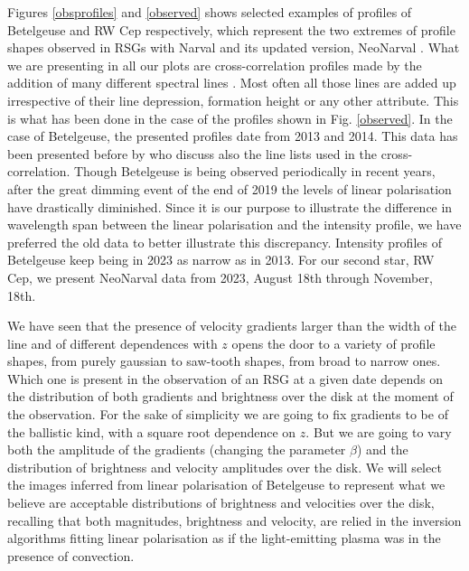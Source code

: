 \documentclass{/Users/art2/TeX/aanda/aa}
\begin{document}
Figures \ref{obsprofiles} and \ref{observed} shows selected examples of profiles of Betelgeuse and RW Cep respectively, which represent the two extremes of profile shapes 
observed in RSGs with Narval and its updated version, NeoNarval \cite[see][for a description of both instruments and the data reduction procedures]{lopez_ariste_three-dimensional_2022,donati_espadons_2006}.
What we are presenting in all our plots are cross-correlation profiles made by the addition of many different spectral lines  \citep{josselin_atmospheric_2007,donati_spectropolarimetric_1997}. Most 
often all those lines are added up irrespective of their line depression, formation height or any other 
attribute. This is what has been done in the case of the profiles shown in  Fig. \ref{observed}. In the case of Betelgeuse, the presented profiles date from 2013 and 2014. This data has been presented before by 
\cite{auriere_discovery_2016} who discuss also the line lists used in the cross-correlation. Though Betelgeuse is being observed periodically 
in recent years, after the great dimming event of the end of 2019 the levels of linear polarisation have drastically diminished. Since 
it is our purpose to illustrate the difference in wavelength span between the linear polarisation and the intensity profile, we have 
preferred the old data to better illustrate this discrepancy. Intensity profiles of Betelgeuse keep being in 2023 as narrow as in 2013. For our 
second star, RW Cep, we present NeoNarval data from 
2023, August 18th through November, 18th.  

We have seen that the presence of velocity gradients larger than the width of the line and of different dependences with $z$ opens the door to a 
variety of profile shapes, from purely gaussian to saw-tooth shapes, from broad to narrow ones. 
Which one is present in the observation 
of an RSG at a given date depends on the distribution of both gradients and brightness over the disk at the moment of the observation.
For the sake of simplicity we are going to fix gradients to be of the ballistic kind, with a square root dependence on $z$. But we are going 
to vary both the amplitude of the gradients (changing the parameter $\beta$) and the distribution of brightness and velocity amplitudes over 
the disk. We will select the images inferred from linear polarisation of Betelgeuse to represent what we believe are acceptable 
distributions of brightness and velocities over the disk, recalling that both magnitudes, brightness and velocity, are relied in the 
inversion algorithms fitting linear polarisation as if the light-emitting plasma was in the presence of convection. 
\end{document}
